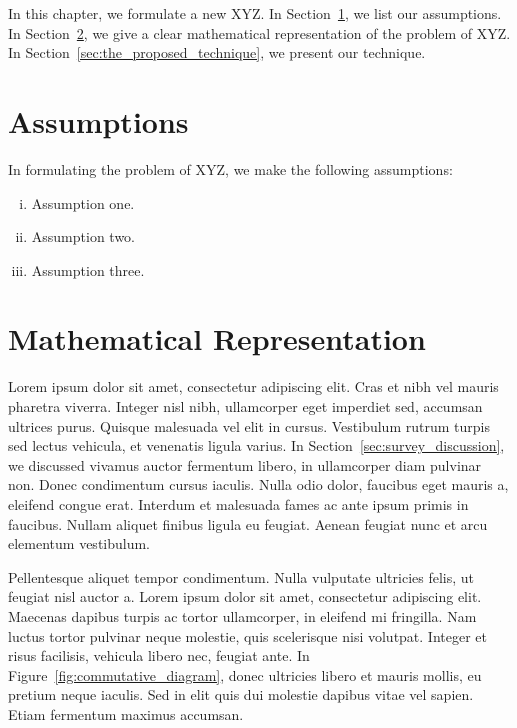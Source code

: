 In this chapter, we formulate a new XYZ. In Section~\ref{sec:assumptions}, we list our assumptions. In Section~\ref{sec:mathematical_representation}, we give a clear mathematical representation of the problem of XYZ. In Section~\ref{sec:the_proposed_technique}, we present our technique. 

\section{Assumptions}
\label{sec:assumptions}

In formulating the problem of XYZ, we make the following assumptions: 
\begin{enumerate}[(i)]
	\item Assumption one. 
	\item Assumption two. 
	\item Assumption three. 
\end{enumerate}


\section{Mathematical Representation}
\label{sec:mathematical_representation}

Lorem ipsum dolor sit amet, consectetur adipiscing elit. Cras et nibh vel mauris pharetra viverra. Integer nisl nibh, ullamcorper eget imperdiet sed, accumsan ultrices purus. Quisque malesuada vel elit in cursus. Vestibulum rutrum turpis sed lectus vehicula, et venenatis ligula varius.  In Section~\ref{sec:survey_discussion}, we discussed vivamus auctor fermentum libero, in ullamcorper diam pulvinar non. Donec condimentum cursus iaculis. Nulla odio dolor, faucibus eget mauris a, eleifend congue erat. Interdum et malesuada fames ac ante ipsum primis in faucibus. Nullam aliquet finibus ligula eu feugiat. Aenean feugiat nunc et arcu elementum vestibulum. \newline

Pellentesque aliquet tempor condimentum. Nulla vulputate ultricies felis, ut feugiat nisl auctor a. Lorem ipsum dolor sit amet, consectetur adipiscing elit. Maecenas dapibus turpis ac tortor ullamcorper, in eleifend mi fringilla. Nam luctus tortor pulvinar neque molestie, quis scelerisque nisi volutpat. Integer et risus facilisis, vehicula libero nec, feugiat ante. In Figure~\ref{fig:commutative_diagram}, donec ultricies libero et mauris mollis, eu pretium neque iaculis. Sed in elit quis dui molestie dapibus vitae vel sapien. Etiam fermentum maximus accumsan. \newline

